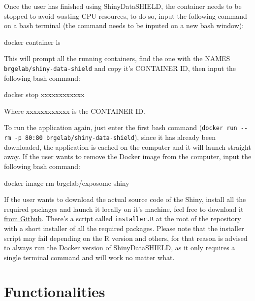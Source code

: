\documentclass[
]{book}
\newenvironment{Shaded}{\begin{snugshade}}{\end{snugshade}}
\newcommand{\ExtensionTok}[1]{#1}
\newcommand{\NormalTok}[1]{#1}
\begin{document}
Once the user has finished using ShinyDataSHIELD, the container needs to be stopped to avoid wasting CPU resources, to do so, input the following command on a bash terminal (the command needs to be inputed on a new bash window):

\begin{Shaded}
\begin{Highlighting}[]
\ExtensionTok{docker}\NormalTok{ container ls}
\end{Highlighting}
\end{Shaded}

This will prompt all the running containers, find the one with the NAMES \texttt{brgelab/shiny-data-shield} and copy it's CONTAINER ID, then input the following bash command:

\begin{Shaded}
\begin{Highlighting}[]
\ExtensionTok{docker}\NormalTok{ stop xxxxxxxxxxxx}
\end{Highlighting}
\end{Shaded}

Where xxxxxxxxxxxx is the CONTAINER ID.

To run the application again, just enter the first bash command (\texttt{docker\ run\ -\/-rm\ -p\ 80:80\ brgelab/shiny-data-shield}), since it has already been downloaded, the application is cached on the computer and it will launch straight away. If the user wants to remove the Docker image from the computer, input the following bash command:

\begin{Shaded}
\begin{Highlighting}[]
\ExtensionTok{docker}\NormalTok{ image rm brgelab/exposome{-}shiny}
\end{Highlighting}
\end{Shaded}

If the user wants to download the actual source code of the Shiny, install all the required packages and launch it locally on it's machine, feel free to download it \href{https://github.com/isglobal-brge/dsOmicsShiny}{from Github}. There's a script called \texttt{installer.R} at the root of the repository with a short installer of all the required packages. Please note that the installer script may fail depending on the R version and others, for that reason is advised to always run the Docker version of ShinyDataSHIELD, as it only requires a single terminal command and will work no matter what.

\hypertarget{functionalities}{%
\chapter{Functionalities}\label{functionalities}}
\end{document}
